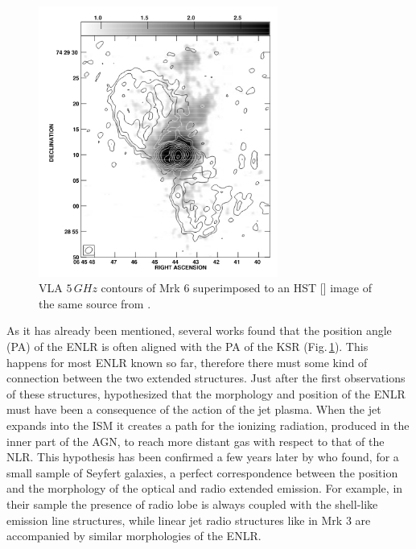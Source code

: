 \documentclass[../main.tex]{subfiles}
\begin{document}
\begin{figure}
\centering
\includegraphics[width=0.7\textwidth]{images/Mrk6_kharb.jpg} 
\caption[]{VLA $5\,\si{GHz}$ contours of Mrk 6 superimposed to an HST [] image of the same source from \citet{Kharb06}. }
\label{fig:mrk6_kharb}
\end{figure}

As it has already been mentioned, several works found that the position angle (PA) of the ENLR is often aligned with the PA of the KSR \citep[e.g.][]{Unger87,Wilson94,Capetti96,Falcke98,Schmitt03,Schmitt03b,Morganti07,Husemann13} (Fig.\,\ref{fig:mrk6_kharb}). 
This happens for most ENLR known so far, therefore there must some kind of connection between the two extended structures.
Just after the first observations of these structures, \citet{Wilson94} hypothesized that the morphology and position of the ENLR must have been a consequence of the action of the jet plasma.
When the jet expands into the ISM it creates a path for the ionizing radiation, produced in the inner part of the AGN, to reach more distant gas with respect to that of the NLR.
This hypothesis has been confirmed a few years later by \citet{Capetti96} who found, for a small sample of Seyfert galaxies, a perfect correspondence between the position and the morphology of the optical and radio extended emission.
For example, in their sample the presence of radio lobe is always coupled with the shell-like emission line structures, while linear jet radio structures like in Mrk 3 are accompanied by similar morphologies of the ENLR.
\end{document}
